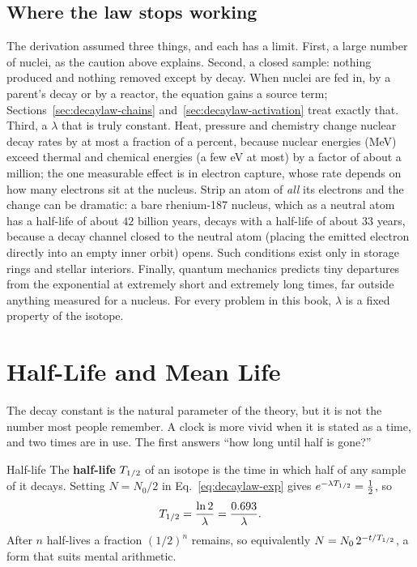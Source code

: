 \subsection{Where the law stops working}
The derivation assumed three things, and each has a limit.
First, a large number of nuclei, as the caution above explains. Second, a closed sample: nothing
produced and nothing removed except by decay. When nuclei are fed in, by a parent's decay or by a
reactor, the equation gains a source term; Sections~\ref{sec:decaylaw-chains}
and~\ref{sec:decaylaw-activation} treat exactly that. Third, a $\lambda$ that is truly constant. Heat,
pressure and chemistry change nuclear decay rates by at most a fraction of a percent, because nuclear
energies (MeV) exceed thermal and chemical energies (a few eV at most) by a factor of about a million;
the one measurable effect is in electron capture, whose rate depends on how many electrons sit at the
nucleus. Strip an atom of \emph{all} its electrons and the change can be dramatic: a bare
rhenium-187 nucleus, which as a neutral atom has a half-life of about $42$ billion years, decays with a
half-life of about $33$ years, because a decay channel closed to the neutral atom (placing the emitted
electron directly into an empty inner orbit) opens. Such conditions exist only in storage rings and
stellar interiors. Finally, quantum mechanics predicts tiny departures from the exponential at extremely
short and extremely long times, far outside anything measured for a nucleus. For every problem in this
book, $\lambda$ is a fixed property of the isotope.

\section{Half-Life and Mean Life}\label{sec:decaylaw-halflife}

The decay constant is the natural parameter of the theory, but it is not the number most people
remember. A clock is more vivid when it is stated as a time, and two times are in use. The first answers
``how long until half is gone?''

\begin{defbox}{Half-life}
The \textbf{half-life} $T_{1/2}$ of an isotope is the time in which half of any sample of it decays.
Setting $N=N_0/2$ in Eq.~\eqref{eq:decaylaw-exp} gives $e^{-\lambda T_{1/2}}=\tfrac12$, so
\begin{equation}\label{eq:decaylaw-half}
T_{1/2}=\frac{\ln2}{\lambda}=\frac{0.693}{\lambda}.
\end{equation}
After $n$ half-lives a fraction $(1/2)^n$ remains, so equivalently $N=N_0\,2^{-t/T_{1/2}}$, a form
that suits mental arithmetic.
\end{defbox}

